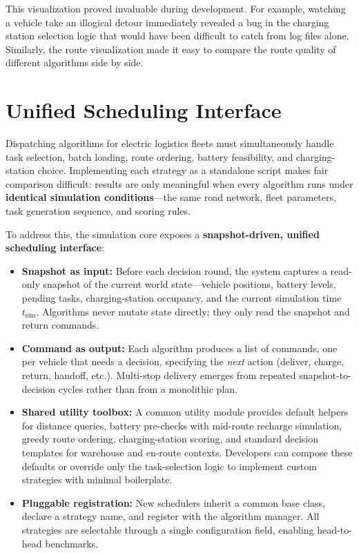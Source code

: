 This visualization proved invaluable during development. For example, watching a vehicle take an illogical detour immediately revealed a bug in the charging station selection logic that would have been difficult to catch from log files alone. Similarly, the route visualization made it easy to compare the route quality of different algorithms side by side.

\section{Unified Scheduling Interface}

Dispatching algorithms for electric logistics fleets must simultaneously handle task selection, batch loading, route ordering, battery feasibility, and charging-station choice. Implementing each strategy as a standalone script makes fair comparison difficult: results are only meaningful when every algorithm runs under \textbf{identical simulation conditions}---the same road network, fleet parameters, task generation sequence, and scoring rules.

To address this, the simulation core exposes a \textbf{snapshot-driven, unified scheduling interface}:

\begin{itemize}[leftmargin=4em]
    \item \textbf{Snapshot as input:} Before each decision round, the system captures a read-only snapshot of the current world state---vehicle positions, battery levels, pending tasks, charging-station occupancy, and the current simulation time $t_{\text{sim}}$. Algorithms never mutate state directly; they only read the snapshot and return commands.
    \item \textbf{Command as output:} Each algorithm produces a list of commands, one per vehicle that needs a decision, specifying the \emph{next} action (deliver, charge, return, handoff, etc.). Multi-stop delivery emerges from repeated snapshot-to-decision cycles rather than from a monolithic plan.
    \item \textbf{Shared utility toolbox:} A common utility module provides default helpers for distance queries, battery pre-checks with mid-route recharge simulation, greedy route ordering, charging-station scoring, and standard decision templates for warehouse and en-route contexts. Developers can compose these defaults or override only the task-selection logic to implement custom strategies with minimal boilerplate.
    \item \textbf{Pluggable registration:} New schedulers inherit a common base class, declare a strategy name, and register with the algorithm manager. All strategies are selectable through a single configuration field, enabling head-to-head benchmarks.
\end{itemize}

